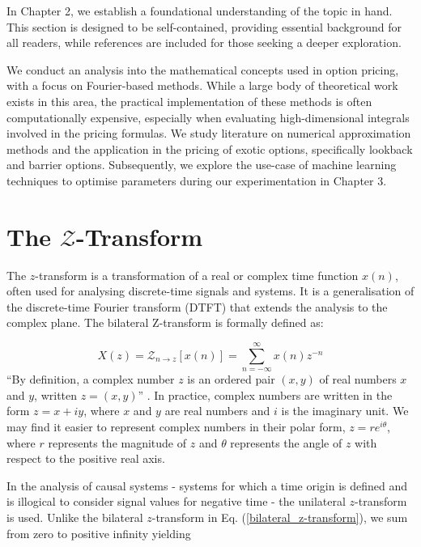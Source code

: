 \documentclass[a4paper]{report}
\begin{document}
In Chapter 2, we establish a foundational understanding of the topic in hand. This section is designed to be self-contained, providing essential background for all readers, while references are included for those seeking a deeper exploration.

We conduct an analysis into the mathematical concepts used in option pricing, with a focus on Fourier-based methods. While a large body of theoretical work exists in this area, the practical implementation of these methods is often computationally expensive, especially when evaluating high-dimensional integrals involved in the pricing formulas. We study literature on numerical approximation methods and the application in the pricing of exotic options, specifically lookback and barrier options. Subsequently, we explore the use-case of machine learning techniques to optimise parameters during our experimentation in Chapter 3.

\section{The \texorpdfstring{$\mathcal{Z}$}{Lg}-Transform}\label{z_transform}

The $z$-transform is a transformation of a real or complex time function $x(n)$, often used for analysing discrete-time signals and systems. It is a generalisation of the discrete-time Fourier transform (DTFT) that extends the analysis to the complex plane. The bilateral Z-transform is formally defined as:

\begin{equation}\label{bilateral_z-transform}
X(z) = \mathcal{Z}_{n \rightarrow z}[x(n)] = \sum^{\infty}_{n = -\infty} x(n)z^{-n}
\end{equation}
``By definition, a complex number $z$ is an ordered pair $(x, y)$ of real numbers $x$ and $y$, written $z = (x, y)$'' \citep{kreyszig2010advanced}. In practice, complex numbers are written in the form $z = x + iy$, where $x$ and $y$ are real numbers and $i$ is the imaginary unit. We may find it easier to represent complex numbers in their polar form, $z = re^{i\theta}$, where $r$ represents the magnitude of $z$ and $\theta$ represents the angle of $z$ with respect to the positive real axis.

In the analysis of causal systems - systems for which a time origin is defined and is illogical to consider signal values for negative time - the unilateral $z$-transform is used. Unlike the bilateral $z$-transform in Eq. (\ref{bilateral_z-transform}), we sum from zero to positive infinity yielding
\end{document}
